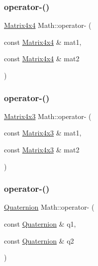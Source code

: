 \mbox{\label{namespace_math_a63a0e723e7843e2eb47b2285846df34f}} 
\subsubsection{\texorpdfstring{operator-\/()}{operator-()}\hspace{0.1cm}{\footnotesize\ttfamily [4/6]}}
{\footnotesize\ttfamily \mbox{\hyperlink{struct_math_1_1_matrix4x4}{Matrix4x4}} Math\+::operator-\/ (\begin{DoxyParamCaption}\item[{const \mbox{\hyperlink{struct_math_1_1_matrix4x4}{Matrix4x4}} \&}]{mat1,  }\item[{const \mbox{\hyperlink{struct_math_1_1_matrix4x4}{Matrix4x4}} \&}]{mat2 }\end{DoxyParamCaption})}

\mbox{\label{namespace_math_a0fd0b23a7349545e6b45a09ea4758be4}} 
\subsubsection{\texorpdfstring{operator-\/()}{operator-()}\hspace{0.1cm}{\footnotesize\ttfamily [5/6]}}
{\footnotesize\ttfamily \mbox{\hyperlink{struct_math_1_1_matrix4x3}{Matrix4x3}} Math\+::operator-\/ (\begin{DoxyParamCaption}\item[{const \mbox{\hyperlink{struct_math_1_1_matrix4x3}{Matrix4x3}} \&}]{mat1,  }\item[{const \mbox{\hyperlink{struct_math_1_1_matrix4x3}{Matrix4x3}} \&}]{mat2 }\end{DoxyParamCaption})}

\mbox{\label{namespace_math_ae4d4050d108be2ff9bbaacbd613cbf48}} 
\subsubsection{\texorpdfstring{operator-\/()}{operator-()}\hspace{0.1cm}{\footnotesize\ttfamily [6/6]}}
{\footnotesize\ttfamily \mbox{\hyperlink{struct_math_1_1_quaternion}{Quaternion}} Math\+::operator-\/ (\begin{DoxyParamCaption}\item[{const \mbox{\hyperlink{struct_math_1_1_quaternion}{Quaternion}} \&}]{q1,  }\item[{const \mbox{\hyperlink{struct_math_1_1_quaternion}{Quaternion}} \&}]{q2 }\end{DoxyParamCaption})}

